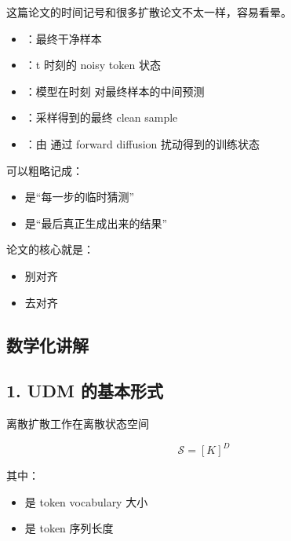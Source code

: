 这篇论文的时间记号和很多扩散论文不太一样，容易看晕。

\begin{itemize}[leftmargin=1.5em]
  \item {}：最终干净样本
  \item {}：t 时刻的 noisy token 状态
  \item {}：模型在时刻  对最终样本的中间预测
  \item {}：采样得到的最终 clean sample
  \item {}：由  通过 forward diffusion 扰动得到的训练状态
\end{itemize}

可以粗略记成：

\begin{itemize}[leftmargin=1.5em]
  \item {} 是“每一步的临时猜测”
  \item {} 是“最后真正生成出来的结果”
\end{itemize}

论文的核心就是：

\begin{itemize}[leftmargin=1.5em]
  \item 别对齐 
  \item 去对齐 
\end{itemize}

\subsection{数学化讲解}

\subsection{1. UDM 的基本形式}

离散扩散工作在离散状态空间

\[
\mathcal{S} = [K]^D
\]

其中：

\begin{itemize}[leftmargin=1.5em]
  \item {} 是 token vocabulary 大小
  \item {} 是 token 序列长度
\end{itemize}

